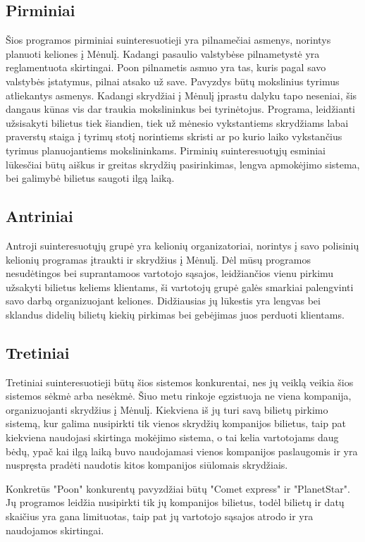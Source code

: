 \documentclass{VUMIFPSkursinis}
\begin{document}
\subsection{Pirminiai} Šios programos pirminiai suinteresuotieji yra pilnamečiai asmenys, norintys planuoti keliones į Mėnulį. Kadangi pasaulio valstybėse pilnametystė yra reglamentuota skirtingai. Poon pilnametis asmuo yra tas, kuris pagal savo valstybės įstatymus, pilnai atsako už save. Pavyzdys būtų mokslinius tyrimus atliekantys asmenys. Kadangi skrydžiai į Mėnulį įprastu dalyku tapo neseniai, šis dangaus kūnas vis dar traukia mokslininkus bei tyrinėtojus. Programa, leidžianti užsisakyti bilietus tiek šiandien, tiek už mėnesio vykstantiems skrydžiams labai praverstų staiga į tyrimų stotį norintiems skristi ar po kurio laiko vykstančius tyrimus planuojantiems mokslininkams. Pirminių suinteresuotųjų esminiai lūkesčiai būtų aiškus ir greitas skrydžių pasirinkimas, lengva apmokėjimo sistema, bei galimybė bilietus saugoti ilgą laiką.

\subsection{Antriniai} Antroji suinteresuotųjų grupė yra kelionių organizatoriai, norintys į savo polisinių kelionių programas įtraukti ir skrydžius į Mėnulį. Dėl mūsų programos nesudėtingos bei suprantamoos vartotojo sąsajos, leidžiančios vienu pirkimu užsakyti bilietus keliems klientams, ši vartotojų grupė galės smarkiai palengvinti savo darbą organizuojant keliones. Didžiausias jų lūkestis yra lengvas bei sklandus didelių bilietų kiekių pirkimas bei gebėjimas juos perduoti klientams.

\subsection{Tretiniai} Tretiniai suinteresuotieji būtų šios sistemos konkurentai, nes jų veiklą veikia šios sistemos sėkmė arba nesėkmė. Šiuo metu rinkoje egzistuoja ne viena kompanija, organizuojanti skrydžius į Mėnulį. Kiekviena iš jų turi savą bilietų pirkimo sistemą, kur galima nusipirkti tik vienos skrydžių kompanijos bilietus, taip pat kiekviena naudojasi skirtinga mokėjimo sistema, o tai kelia vartotojams daug bėdų, ypač kai ilgą laiką buvo naudojamasi vienos kompanijos paslaugomis ir yra nuspręsta pradėti naudotis kitos kompanijos siūlomais skrydžiais. 

Konkretūs "Poon" konkurentų pavyzdžiai būtų "Comet express" ir "PlanetStar". Jų programos leidžia nusipirkti tik jų kompanijos bilietus, todėl bilietų ir datų skaičius yra gana limituotas, taip pat jų vartotojo sąsajos atrodo ir yra naudojamos skirtingai. 
\end{document}
